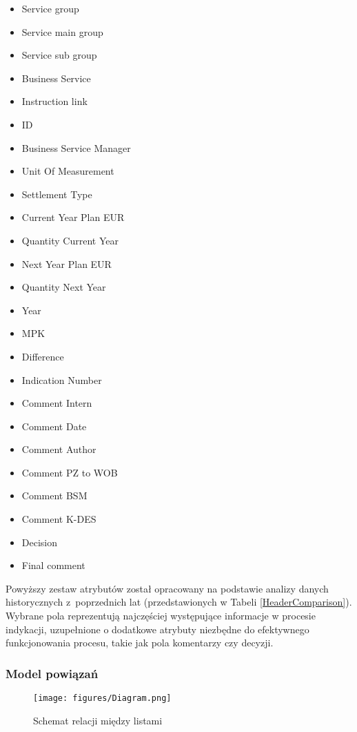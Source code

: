 \begin{multicols}{3}
  \begin{itemize}
    \item Service group
    \item Service main group
    \item Service sub group
    \item Business Service
    \item Instruction link
    \item ID
    \item Business Service Manager
    \item Unit Of Measurement
    \item Settlement Type
    \item Current Year Plan EUR
    \item Quantity Current Year
    \item Next Year Plan EUR
    \item Quantity Next Year
    \item Year
    \item MPK
    \item Difference
    \item Indication Number
    \item Comment Intern
    \item Comment Date
    \item Comment Author
    \item Comment PZ to WOB
    \item Comment BSM
    \item Comment K-DES
    \item Decision
    \item Final comment
  \end{itemize}
\end{multicols}
Powyższy zestaw atrybutów został opracowany na podstawie analizy danych historycznych z~poprzednich lat (przedstawionych w Tabeli \ref{HeaderComparison}). Wybrane pola reprezentują najczęściej występujące informacje w procesie indykacji, uzupełnione o dodatkowe atrybuty niezbędne do efektywnego funkcjonowania procesu, takie jak pola komentarzy czy decyzji.

\subsubsection*{Model powiązań}

\begin{figure}[h]
  \centering
  \texttt{[image: figures/Diagram.png]}
  \caption{Schemat relacji między listami}
  \label{SchematList}
\end{figure}

